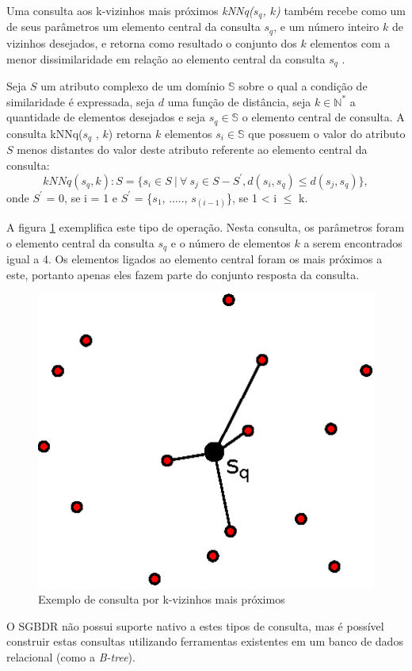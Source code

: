 Uma consulta aos k-vizinhos mais próximos \textit{kNNq($s_q$, $k$)} também recebe como um de seus parâmetros um elemento central da consulta $s_q$, e um número inteiro $k$ de vizinhos desejados, e retorna
como resultado o conjunto dos $k$ elementos com a menor dissimilaridade em relação ao elemento central da consulta $s_q$ \cite{POLA2010}.

\begin{mydef}
  \label{def:def_knnq}
  Seja $S$ um atributo complexo de um domínio $\mathbb{S}$ sobre o qual a condição de similaridade é expressada, seja $d$ uma
  função de distância, seja $k \in \mathbb{N^*}$ a quantidade de elementos desejados e seja $s_q \in \mathbb{S}$ o elemento
  central de consulta. A consulta kNNq($s_q$ , $k$) retorna $k$ elementos $s_i \in \mathbb{S}$ que possuem o valor do atributo $S$ menos distantes do valor 
  deste atributo referente ao elemento central da consulta\cite{Ferreira2009}:
  \begin{equation} \label{eq:knnq}   
    kNNq(s_q, k): S = \{s_i \in S \ |\  \forall \ s_j \in S - S^{'}, d(s_i, s_q)\leq d(s_j, s_q)\},
  \end{equation}
  onde $S^{'}$ = 0, se i = 1 e $S^{'}$ = \{$s_1$, ....., $s_{(i-1)}$\}, se 1 < i $\leq$ k. 
\end{mydef}

A figura \ref{fig:exemploknnq} exemplifica este tipo de operação. Nesta consulta, os parâmetros foram o elemento central da consulta $s_q$ e o número de elementos $k$ a serem
encontrados igual a 4. Os elementos ligados ao elemento central foram os mais próximos a este, portanto apenas eles fazem parte do conjunto resposta da consulta.
\begin{figure}[H]
\centering
\includegraphics[width=.3\textwidth]{dados/figuras/knnq.eps}
\caption{Exemplo de consulta por k-vizinhos mais próximos}
\label{fig:exemploknnq}
\end{figure}

O SGBDR não possui suporte nativo a estes tipos de consulta, mas é possível construir estas consultas utilizando ferramentas existentes em um banco de dados relacional (como a \textit{B-tree}).\par %


